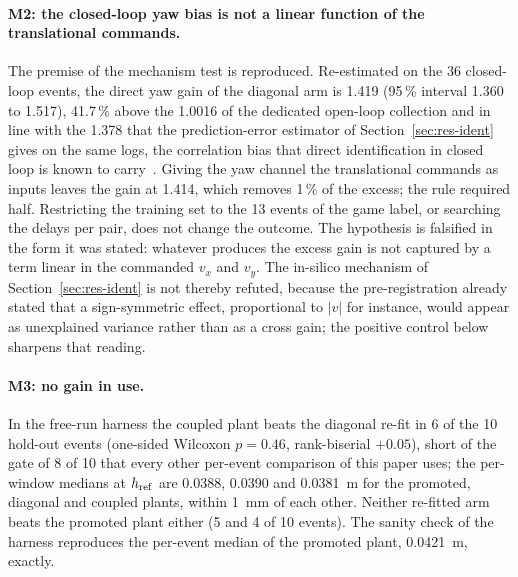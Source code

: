 \paragraph{M2: the closed-loop yaw bias is not a linear function of the translational commands.} The premise of the mechanism test is reproduced. Re-estimated on the 36 closed-loop events, the direct yaw gain of the diagonal arm is 1.419 (95\,\% interval 1.360 to 1.517), 41.7\,\% above the 1.0016 of the dedicated open-loop collection and in line with the 1.378 that the prediction-error estimator of Section~\ref{sec:res-ident} gives on the same logs, the correlation bias that direct identification in closed loop is known to carry~\cite{forssell1999closedloop}. Giving the yaw channel the translational commands as inputs leaves the gain at 1.414, which removes 1\,\% of the excess; the rule required half. Restricting the training set to the 13 events of the game label, or searching the delays per pair, does not change the outcome. The hypothesis is falsified in the form it was stated: whatever produces the excess gain is not captured by a term linear in the commanded $v_x$ and $v_y$. The in-silico mechanism of Section~\ref{sec:res-ident} is not thereby refuted, because the pre-registration already stated that a sign-symmetric effect, proportional to $|v|$ for instance, would appear as unexplained variance rather than as a cross gain; the positive control below sharpens that reading.

\paragraph{M3: no gain in use.} In the free-run harness the coupled plant beats the diagonal re-fit in 6 of the 10 hold-out events (one-sided Wilcoxon $p = 0.46$, rank-biserial $+0.05$), short of the gate of 8 of 10 that every other per-event comparison of this paper uses; the per-window medians at $h_{\mathrm{ref}}$ are 0.0388, 0.0390 and 0.0381~m for the promoted, diagonal and coupled plants, within 1~mm of each other. Neither re-fitted arm beats the promoted plant either (5 and 4 of 10 events). The sanity check of the harness reproduces the per-event median of the promoted plant, 0.0421~m, exactly.

